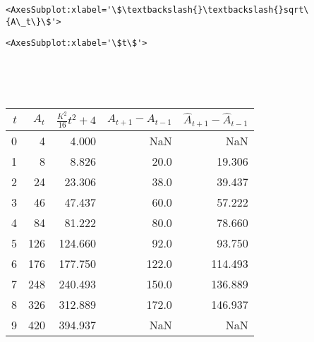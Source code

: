 \documentclass[11pt]{article}
\begin{document}
    
    \begin{Verbatim}[commandchars=\\\{\}]
<AxesSubplot:xlabel='\$\textbackslash{}\textbackslash{}sqrt\{A\_t\}\$'>
    \end{Verbatim}

    
    
    \begin{Verbatim}[commandchars=\\\{\}]
<AxesSubplot:xlabel='\$t\$'>
    \end{Verbatim}

    
    \begin{center}
    \end{center}
    { \hspace*{\fill} \\}
    
    \begin{center}
    \end{center}
    { \hspace*{\fill} \\}
    
    \begin{tabular}{rrrrr}
\toprule
 $t$ &  $A_t$ &  $\frac{K^2}{16}t^2+4$ &  $A_{t+1}-A_{t-1}$ &  $\hat A_{t+1}-\hat A_{t-1}$ \\
\midrule
   0 &      4 &                  4.000 &                NaN &                          NaN \\
   1 &      8 &                  8.826 &               20.0 &                       19.306 \\
   2 &     24 &                 23.306 &               38.0 &                       39.437 \\
   3 &     46 &                 47.437 &               60.0 &                       57.222 \\
   4 &     84 &                 81.222 &               80.0 &                       78.660 \\
   5 &    126 &                124.660 &               92.0 &                       93.750 \\
   6 &    176 &                177.750 &              122.0 &                      114.493 \\
   7 &    248 &                240.493 &              150.0 &                      136.889 \\
   8 &    326 &                312.889 &              172.0 &                      146.937 \\
   9 &    420 &                394.937 &                NaN &                          NaN \\
\bottomrule
\end{tabular}
\end{document}
